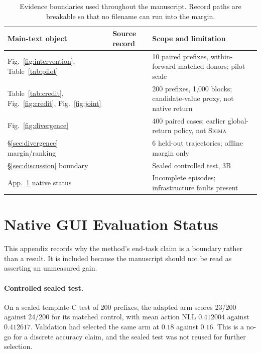 \documentclass{article}
\newcommand{\method}{\textsc{Sigma}}
\begin{document}
\begin{table}[h]
\caption{Evidence boundaries used throughout the manuscript. Record paths are
breakable so that no filename can run into the margin.}\label{tab:evidence}
\centering\footnotesize
\begin{tabular}{@{}L{.225\linewidth}L{.345\linewidth}L{.325\linewidth}@{}}
\toprule
Main-text object & Source record & Scope and limitation\\
\midrule
Fig.~\ref{fig:intervention}, Table~\ref{tab:pilot} &
 &
10 paired prefixes, within-forward matched donors; pilot scale\\
Table~\ref{tab:credit}, Fig.~\ref{fig:credit}, Fig.~\ref{fig:joint} &
 &
200 prefixes, 1{,}000 blocks; candidate-value proxy, not native return\\
Fig.~\ref{fig:divergence} &
 &
400 paired cases; earlier global-return policy, not \method\\
\S\ref{sec:divergence} margin/ranking &
 &
6 held-out trajectories; offline margin only\\
\S\ref{sec:discussion} boundary &
 &
Sealed controlled test, 3B\\
App.~\ref{app:native} native status &
 &
Incomplete episodes; infrastructure faults present\\
\bottomrule
\end{tabular}
\end{table}

\section{Native GUI Evaluation Status}
\label{app:native}
This appendix records why the method's end-task claim is a boundary rather than
a result. It is included because the manuscript should not be read as asserting
an unmeasured gain.

\paragraph{Controlled sealed test.} On a sealed template-C test of 200 prefixes,
the adapted arm scores 23/200 against 24/200 for its matched control, with mean
action NLL $0.412004$ against $0.412617$. Validation had selected the same arm
at $0.18$ against $0.16$. This is a no-go for a discrete accuracy claim, and the
sealed test was not reused for further selection.
\end{document}
